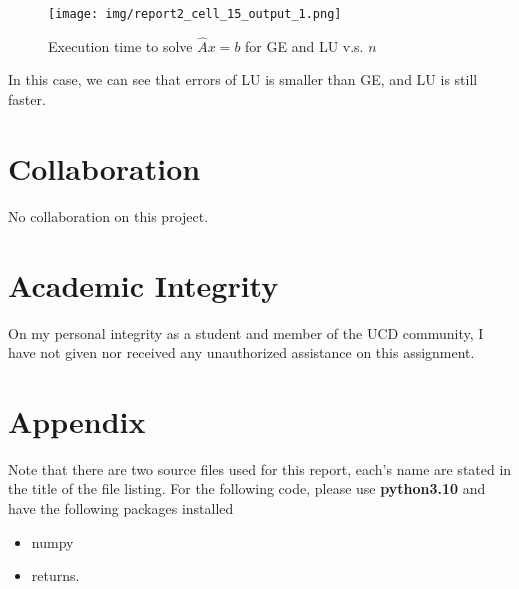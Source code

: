 \documentclass[a4paper,12pt]{article}
\begin{document}
\begin{figure}[H]
    \centering
     \texttt{[image: img/report2\_cell\_15\_output\_1.png]}
     \caption{Execution time to solve $\hat{A}x=b$ for GE and LU v.s. $n$}
     \label{fig:2}   
\end{figure}

In this case,
we can see that errors of LU is smaller than GE,
and LU is still faster.

\section{Collaboration}
No collaboration on this project.


\section{Academic Integrity}
On my personal integrity as a student and member of the UCD community, I have not given nor received any unauthorized assistance on this assignment.


\section{Appendix}
Note that there are two source files used for this report,
each's name are stated in the title of the file listing.
For the following code, please use \textbf{python3.10} and have the following packages installed
\begin{itemize}
	\item numpy
	\item returns.
\end{itemize}



\end{document}
